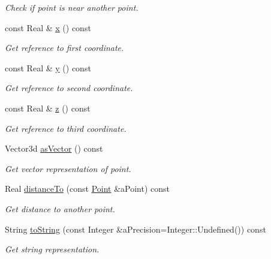 \begin{DoxyCompactItemize}
\begin{DoxyCompactList}\small\item\em Check if point is near another point. \end{DoxyCompactList}\item 
const Real \& \hyperlink{classostk_1_1math_1_1geom_1_1d3_1_1objects_1_1_point_a68a5204a2ca259486a1c1e442c833203}{x} () const
\begin{DoxyCompactList}\small\item\em Get reference to first coordinate. \end{DoxyCompactList}\item 
const Real \& \hyperlink{classostk_1_1math_1_1geom_1_1d3_1_1objects_1_1_point_a77c908e2091fa581f8e975824dbe4f22}{y} () const
\begin{DoxyCompactList}\small\item\em Get reference to second coordinate. \end{DoxyCompactList}\item 
const Real \& \hyperlink{classostk_1_1math_1_1geom_1_1d3_1_1objects_1_1_point_a16b88664b655d69c146421dfb75bc246}{z} () const
\begin{DoxyCompactList}\small\item\em Get reference to third coordinate. \end{DoxyCompactList}\item 
Vector3d \hyperlink{classostk_1_1math_1_1geom_1_1d3_1_1objects_1_1_point_a00034296a5aab3bcc8c4fe46584f119a}{as\+Vector} () const
\begin{DoxyCompactList}\small\item\em Get vector representation of point. \end{DoxyCompactList}\item 
Real \hyperlink{classostk_1_1math_1_1geom_1_1d3_1_1objects_1_1_point_a17c835ac01d24fb703eee44191331ee7}{distance\+To} (const \hyperlink{classostk_1_1math_1_1geom_1_1d3_1_1objects_1_1_point}{Point} \&a\+Point) const
\begin{DoxyCompactList}\small\item\em Get distance to another point. \end{DoxyCompactList}\item 
String \hyperlink{classostk_1_1math_1_1geom_1_1d3_1_1objects_1_1_point_a352afced9fe6ef8262e383071fafde7d}{to\+String} (const Integer \&a\+Precision=Integer\+::\+Undefined()) const
\begin{DoxyCompactList}\small\item\em Get string representation. \end{DoxyCompactList}\item 

\end{DoxyCompactItemize}
